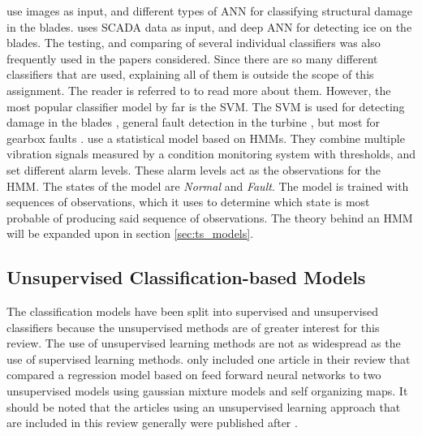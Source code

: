 \textcite{image_based_surface_damage_detection_DL_drone_inspection, image_based_YOLO_YSODA, AI_image_analytics_2_classify_blade_defects, blade_defect_detection_imaging_array} use images as input, and different types of ANN for classifying structural damage in the blades. 
\textcite{deep_learning_for_imbalanced_class_detection_bearing_cm} uses SCADA data as input, and deep ANN for detecting ice on the blades. 
The testing, and comparing of several individual classifiers was also frequently used in the papers considered. 
Since there are so many different classifiers that are used, explaining all of them is outside the scope of this assignment. 
The reader is referred to \cite{ml_cm_wt_blade_ARMA_2018, lin_and_non_lin_feat_for_ice_detection_on_blades, image_texture_analysis_FD_wt, ice_detection_using_ITL, vibration_ARMA_decision_tree_cm_wt} to read more about them.
However, the most popular classifier model by far is the SVM. 
The SVM is used for detecting damage in the blades \cite{blade_damage_detection_sup_ml_alg}, general fault detection in the turbine \cite{fault_classification_using_CSO_SVM}, but most for gearbox faults \cite{VMD_MPE_COVAL_fault_detection_gearbox,vibration_acustic_decision_tree_SVM_gearbox, integrated_cm_bearing_fault_wt_gearbox, roller_bearings_cm_fisher_score_and_permutation_entropy}. 
\textcite{fault_monitoring_HMM} use a statistical model based on HMMs. 
They combine multiple vibration signals measured by a condition monitoring system with thresholds, and set different alarm levels. 
These alarm levels act as the observations for the HMM. 
The states of the model are \textit{Normal} and \textit{Fault}. 
The model is trained with sequences of observations, which it uses to determine which state is most probable of producing said sequence of observations. \bigskip 
The theory behind an HMM will be expanded upon in section \ref{sec:ts_models}.

\newpage
\subsection{Unsupervised Classification-based Models}
The classification models have been split into supervised and unsupervised classifiers because the unsupervised methods are of greater interest for this review. 
The use of unsupervised learning methods are not as widespread as the use of supervised learning methods. 
\textcite{ml_for_wt_cond_monit_rev} only included one article in their review that compared a regression model based on feed forward neural networks to two unsupervised models using gaussian mixture models and self organizing maps. 
It should be noted that the articles using an unsupervised learning approach that are included in this review generally were published after \textcite{ml_for_wt_cond_monit_rev}.

